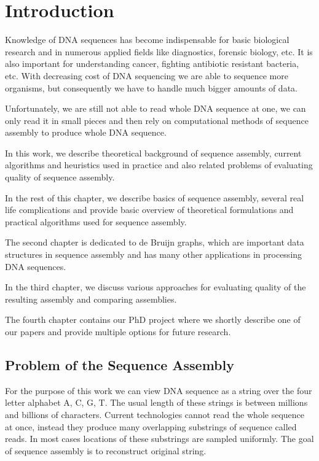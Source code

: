 \chapter{Introduction}

Knowledge of DNA sequences has become indispensable for basic biological research
and in numerous applied fields like diagnostics, forensic biology, etc.
It is also important for understanding cancer, fighting antibiotic resistant bacteria, etc.
With decreasing cost of DNA sequencing we are able to sequence more organisms,
but consequently we have to handle much bigger amounts of data. 

Unfortunately, we are still not able to read whole DNA sequence at one, we can only
read it in small pieces and then rely on computational methods of sequence assembly
to produce whole DNA sequence.

In this work, we describe theoretical background of sequence assembly,
current algorithms and heuristics used in practice and also related 
problems of evaluating quality of sequence assembly.

In the rest of this chapter, we describe basics of sequence assembly,
several real life complications and provide basic overview of theoretical
formulations and practical algorithms used for sequence assembly.

The second chapter is dedicated to de Bruijn graphs, which
are important data structures in sequence assembly and has many other
applications in processing DNA sequences.

In the third chapter, we discuss various approaches for evaluating
quality of the resulting assembly and comparing assemblies.

The fourth chapter contains our PhD project where we
shortly describe one of our papers and provide multiple
options for future research.

\section{Problem of the Sequence Assembly}

For the purpose of this work we can view DNA sequence as a string over the
four letter alphabet A, C, G, T. The usual length of these strings
is between millions and billions of characters.
Current technologies cannot read the whole sequence at once, instead they produce many
overlapping substrings of sequence called reads.
In most cases locations of these substrings are sampled uniformly.
The goal of sequence assembly is to reconstruct original string.

